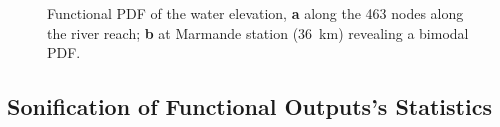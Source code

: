 \begin{figure}[!ht]               
\centering
{}
\caption{Functional PDF of the water elevation, \textbf{a} along the 463 nodes along the river reach; \textbf{b} at Marmande station (36~km) revealing a bimodal PDF.}
\label{fig:pdf_MASCARET}
\end{figure}

\subsection{Sonification of Functional Outputs's Statistics}
\label{subsec:sound}

